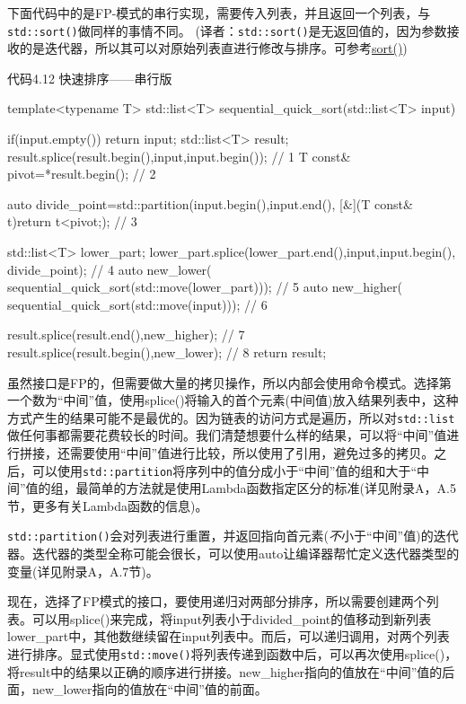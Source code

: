 下面代码中的是FP-模式的串行实现，需要传入列表，并且返回一个列表，与\texttt{std::sort()}做同样的事情不同。
(译者：\texttt{std::sort()}是无返回值的，因为参数接收的是迭代器，所以其可以对原始列表直进行修改与排序。可参考\href{http://www.cplusplus.com/reference/algorithm/sort/?kw=sort}{sort()})

代码4.12 快速排序——串行版

\begin{cpp}
template<typename T>
std::list<T> sequential_quick_sort(std::list<T> input)
{
  if(input.empty())
  {
    return input;
  }
  std::list<T> result;
  result.splice(result.begin(),input,input.begin());  // 1
  T const& pivot=*result.begin();  // 2

  auto divide_point=std::partition(input.begin(),input.end(),
             [&](T const& t){return t<pivot;});  // 3

  std::list<T> lower_part;
  lower_part.splice(lower_part.end(),input,input.begin(),
             divide_point);  // 4
  auto new_lower(
             sequential_quick_sort(std::move(lower_part)));  // 5
  auto new_higher(
             sequential_quick_sort(std::move(input)));  // 6

  result.splice(result.end(),new_higher);  // 7
  result.splice(result.begin(),new_lower);  // 8
  return result;
}
\end{cpp}

虽然接口是FP的，但需要做大量的拷贝操作，所以内部会使用命令模式。选择第一个数为“中间”值，使用splice()将输入的首个元素(中间值)放入结果列表中，这种方式产生的结果可能不是最优的。因为链表的访问方式是遍历，所以对\texttt{std::list}做任何事都需要花费较长的时间。我们清楚想要什么样的结果，可以将“中间”值进行拼接，还需要使用“中间”值进行比较，所以使用了引用，避免过多的拷贝。之后，可以使用\texttt{std::partition}将序列中的值分成小于“中间”值的组和大于“中间”值的组，最简单的方法就是使用Lambda函数指定区分的标准(详见附录A，A.5节，更多有关Lambda函数的信息)。

\texttt{std::partition()}会对列表进行重置，并返回指向首元素(\textit{不}小于“中间”值)的迭代器。迭代器的类型全称可能会很长，可以使用auto让编译器帮忙定义迭代器类型的变量(详见附录A，A.7节)。

现在，选择了FP模式的接口，要使用递归对两部分排序，所以需要创建两个列表。可以用splice()来完成，将input列表小于divided\_point的值移动到新列表lower\_part中，其他数继续留在input列表中。而后，可以递归调用，对两个列表进行排序。显式使用\texttt{std::move()}将列表传递到函数中后，可以再次使用splice()，将result中的结果以正确的顺序进行拼接。new\_higher指向的值放在“中间”值的后面，new\_lower指向的值放在“中间”值的前面。

